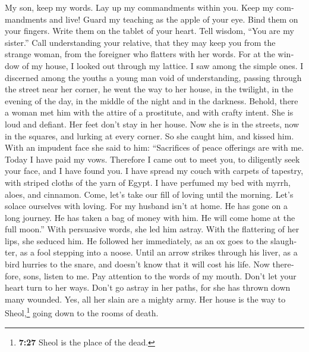 \begin{paracol}{2}
\begin{otherlanguage}{english}
 My son, keep my words. Lay up my commandments within you.
 Keep my commandments and live! Guard my teaching as the
apple of your eye.  Bind them on your fingers. Write them
on the tablet of your heart.  Tell wisdom, ``You are my
sister.'' Call understanding your relative,  that they may
keep you from the strange woman, from the foreigner who flatters with
her words.  For at the window of my house, I looked out
through my lattice.  I saw among the simple ones. I
discerned among the youths a young man void of understanding,
 passing through the street near her corner, he went the
way to her house,  in the twilight, in the evening of the
day, in the middle of the night and in the darkness. 
Behold, there a woman met him with the attire of a prostitute, and with
crafty intent.  She is loud and defiant. Her feet don't
stay in her house.  Now she is in the streets, now in the
squares, and lurking at every corner.  So she caught him,
and kissed him. With an impudent face she said to him: 
``Sacrifices of peace offerings are with me. Today I have paid my vows.
 Therefore I came out to meet you, to diligently seek
your face, and I have found you.  I have spread my couch
with carpets of tapestry, with striped cloths of the yarn of Egypt.
 I have perfumed my bed with myrrh, aloes, and cinnamon.
 Come, let's take our fill of loving until the morning.
Let's solace ourselves with loving.  For my husband isn't
at home. He has gone on a long journey.  He has taken a
bag of money with him. He will come home at the full moon.''
 With persuasive words, she led him astray. With the
flattering of her lips, she seduced him.  He followed her
immediately, as an ox goes to the slaughter, as a fool stepping into a
noose.  Until an arrow strikes through his liver, as a
bird hurries to the snare, and doesn't know that it will cost his life.
 Now therefore, sons, listen to me. Pay attention to the
words of my mouth.  Don't let your heart turn to her
ways. Don't go astray in her paths,  for she has thrown
down many wounded. Yes, all her slain are a mighty army. 
Her house is the way to Sheol,\footnote{\textbf{7:27} Sheol is the place
  of the dead.} going down to the rooms of death.


\end{otherlanguage}
\end{paracol}
